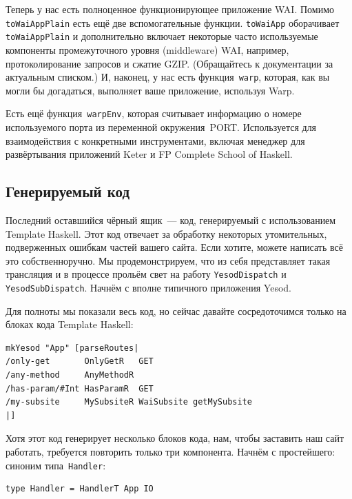 Теперь у нас есть полноценное функционирующее приложение WAI. Помимо
\lstinline'toWaiAppPlain' есть ещё две вспомогательные функции.
\lstinline'toWaiApp' оборачивает \lstinline'toWaiAppPlain' и дополнительно
включает некоторые часто используемые компоненты промежуточного уровня
(middleware) WAI, например, протоколирование запросов и сжатие GZIP.
(Обращайтесь к документации за актуальным списком.) И, наконец, у нас есть
функция~\lstinline'warp', которая, как вы могли бы догадаться, выполняет ваше
приложение, используя Warp.

\begin{remark}
    Есть ещё функция~\lstinline'warpEnv', которая считывает информацию о номере
    используемого порта из переменной окружения~PORT. Используется для
    взаимодействия с конкретными инструментами, включая менеджер для
    развёртывания приложений Keter и FP Complete School of Haskell.
\end{remark}

\subsection{Генерируемый код}
Последний оставшийся чёрный ящик~--- код, генерируемый с использованием
Template Haskell. Этот код отвечает за обработку некоторых утомительных,
подверженных ошибкам частей вашего сайта. Если хотите, можете написать всё это
собственноручно. Мы продемонстрируем, что из себя представляет такая трансляция
и в процессе прольём свет на работу \lstinline'YesodDispatch' и
\lstinline'YesodSubDispatch'. Начнём с вполне типичного приложения Yesod.


Для полноты мы показали весь код, но сейчас давайте сосредоточимся только на
блоках кода Template Haskell:
\begin{lstlisting}
mkYesod "App" [parseRoutes|
/only-get       OnlyGetR   GET
/any-method     AnyMethodR
/has-param/#Int HasParamR  GET
/my-subsite     MySubsiteR WaiSubsite getMySubsite
|]
\end{lstlisting}

Хотя этот код генерирует несколько блоков кода, нам, чтобы заставить наш сайт
работать, требуется повторить только три компонента. Начнём с простейшего:
синоним типа~\lstinline'Handler':
\begin{lstlisting}
type Handler = HandlerT App IO
\end{lstlisting}

